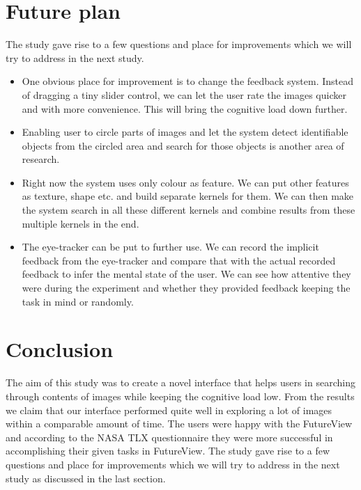 \documentclass[english]{tktltiki}
\begin{document}
\section{Future plan}

The study gave rise to a few questions and place for improvements which we will try to address in the next study.

\begin{itemize}
	\item One obvious place for improvement is to change the feedback system. Instead of dragging a tiny slider control, we can let the user rate the images quicker and with more convenience. This will bring the cognitive load down further.
	\item Enabling user to circle parts of images and let the system detect identifiable objects from the circled area and search for those objects is another area of research.
	\item Right now the system uses only colour as feature. We can put other features as texture, shape etc. and build separate kernels for them. We can then make the system search in all these different kernels and combine results from these multiple kernels in the end.
	\item The eye-tracker can be put to further use. We can record the implicit feedback from the eye-tracker and compare that with the actual recorded feedback to infer the mental state of the user. We can see how attentive they were during the experiment and whether they provided feedback keeping the task in mind or randomly.
\end{itemize}

\section{Conclusion}

The aim of this study was to create a novel interface that helps users in searching through contents of images while keeping the cognitive load low. From the results we claim that our interface performed quite well in exploring a lot of images within a comparable amount of time. The users were happy with the FutureView and according to the NASA TLX questionnaire they were more successful in accomplishing their given tasks in FutureView. The study gave rise to a few questions and place for improvements which we will try to address in the next study as discussed in the last section. 


\end{document}

